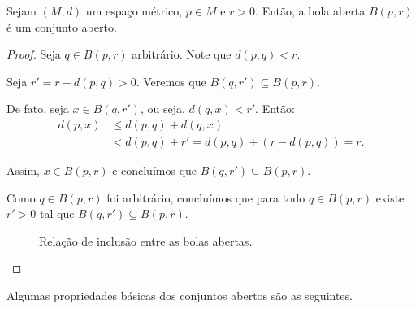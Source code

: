 \begin{proposition}
    Sejam $(M,d)$ um espaço métrico, $p \in M$ e $r>0$.
    Então, a bola aberta $B(p, r)$ é um conjunto aberto.
\end{proposition}
\begin{proof}
    Seja $q \in B(p, r)$ arbitrário.
    Note que $d(p, q) < r$.

    Seja $r' = r - d(p, q) > 0$.
    Veremos que $B(q, r') \subseteq B(p, r)$.

    De fato, seja $x \in B(q, r')$, ou seja, $d(q, x) < r'$.
    Então:
    \begin{align*}
        d(p, x) &\leq d(p, q) + d(q, x) \\
        &< d(p, q) + r' = d(p, q) + (r - d(p, q)) = r.
    \end{align*}

    Assim, $x \in B(p, r)$ e concluímos que $B(q, r') \subseteq B(p, r)$.

    Como $q \in B(p, r)$ foi arbitrário, concluímos que para todo $q \in B(p, r)$ existe $r'>0$ tal que $B(q, r')\subseteq B(p, r)$.

    \begin{figure}[H]
    \centering
    \caption{Relação de inclusão entre as bolas abertas.}
    \end{figure}
\end{proof}

Algumas propriedades básicas dos conjuntos abertos são as seguintes.

